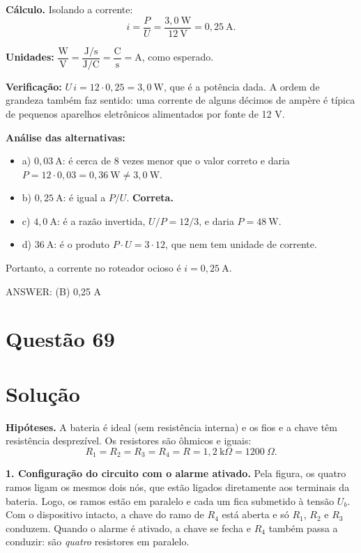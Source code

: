\documentclass{article}%
\begin{document}
\textbf{Cálculo.} Isolando a corrente:
\[
i = \frac{P}{U} = \frac{3{,}0\ \text{W}}{12\ \text{V}} = 0{,}25\ \text{A}.
\]

\textbf{Unidades:} $\dfrac{\text{W}}{\text{V}} = \dfrac{\text{J/s}}{\text{J/C}} = \dfrac{\text{C}}{\text{s}} = \text{A}$, como esperado.

\textbf{Verificação:} $U\,i = 12 \cdot 0{,}25 = 3{,}0\ \text{W}$, que é a potência dada. A ordem de grandeza também faz sentido: uma corrente de alguns décimos de ampère é típica de pequenos aparelhos eletrônicos alimentados por fonte de 12 V.

\textbf{Análise das alternativas:}
\begin{itemize}
\item a) $0{,}03\ \text{A}$: é cerca de 8 vezes menor que o valor correto e daria $P = 12 \cdot 0{,}03 = 0{,}36\ \text{W} \neq 3{,}0\ \text{W}$.
\item b) $0{,}25\ \text{A}$: é igual a $P/U$. \textbf{Correta.}
\item c) $4{,}0\ \text{A}$: é a razão invertida, $U/P = 12/3$, e daria $P = 48\ \text{W}$.
\item d) $36\ \text{A}$: é o produto $P\cdot U = 3\cdot 12$, que nem tem unidade de corrente.
\end{itemize}

Portanto, a corrente no roteador ocioso é $i = 0{,}25\ \text{A}$.

ANSWER: (B) 0,25 A%
\newpage%
\section*{Questão 69}

\section*{Solução}

\textbf{Hipóteses.} A bateria é ideal (sem resistência interna) e os fios e a chave têm resistência desprezível. Os resistores são ôhmicos e iguais:
\[
R_1=R_2=R_3=R_4=R=1{,}2\ \text{k}\Omega = 1200\ \Omega .
\]

\textbf{1. Configuração do circuito com o alarme ativado.} Pela figura, os quatro ramos ligam os mesmos dois nós, que estão ligados diretamente aos terminais da bateria. Logo, os ramos estão em paralelo e cada um fica submetido à tensão $U_b$. Com o dispositivo intacto, a chave do ramo de $R_4$ está aberta e só $R_1$, $R_2$ e $R_3$ conduzem. Quando o alarme é ativado, a chave se fecha e $R_4$ também passa a conduzir: são \emph{quatro} resistores em paralelo.
\end{document}
